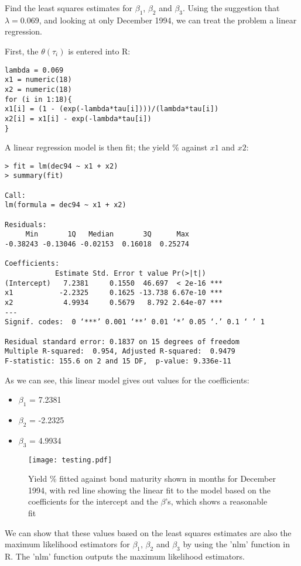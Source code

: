 \documentclass[11pt, a4paper]{article}
\begin{document}
Find the least squares estimates for $\beta_{1}$, $\beta_{2}$ and $\beta_{3}$. Using the suggestion that $\lambda = 0.069$, and looking at only December 1994, we can treat the problem a linear regression.

First, the $\theta(\tau_{i})$ is entered into R:
\begin{verbatim}
lambda = 0.069
x1 = numeric(18)
x2 = numeric(18)
for (i in 1:18){
x1[i] = (1 - (exp(-lambda*tau[i])))/(lambda*tau[i])
x2[i] = x1[i] - exp(-lambda*tau[i])
}
\end{verbatim}

A linear regression model is then fit; the yield \% against $x1$ and $x2$:
\begin{verbatim}
> fit = lm(dec94 ~ x1 + x2)
> summary(fit)

Call:
lm(formula = dec94 ~ x1 + x2)

Residuals:
     Min       1Q   Median       3Q      Max 
-0.38243 -0.13046 -0.02153  0.16018  0.25274 

Coefficients:
            Estimate Std. Error t value Pr(>|t|)    
(Intercept)   7.2381     0.1550  46.697  < 2e-16 ***
x1           -2.2325     0.1625 -13.738 6.67e-10 ***
x2            4.9934     0.5679   8.792 2.64e-07 ***
---
Signif. codes:  0 ‘***’ 0.001 ‘**’ 0.01 ‘*’ 0.05 ‘.’ 0.1 ‘ ’ 1

Residual standard error: 0.1837 on 15 degrees of freedom
Multiple R-squared:  0.954,	Adjusted R-squared:  0.9479 
F-statistic: 155.6 on 2 and 15 DF,  p-value: 9.336e-11
\end{verbatim}

As we can see, this linear model gives out values for the coefficients:
\begin{itemize}
\item $\beta_{1}$ = 7.2381
\item $\beta_{2}$ = -2.2325
\item $\beta_{3}$ = 4.9934
\end{itemize}

\begin{figure}[!h]
\centering
\texttt{[image: testing.pdf]}
\caption{Yield \% fitted against bond maturity shown in months for December 1994, with red line showing the linear fit to the model based on the coefficients for the intercept and the $\beta$'s, which shows a reasonable fit}
\end{figure}

\clearpage

We can show that these values based on the least squares estimates are also the maximum likelihood estimators for $\beta_{1}$, $\beta_{2}$ and $\beta_{3}$ by using the 'nlm' function in R. The 'nlm' function outputs the maximum likelihood estimators.
\end{document}
